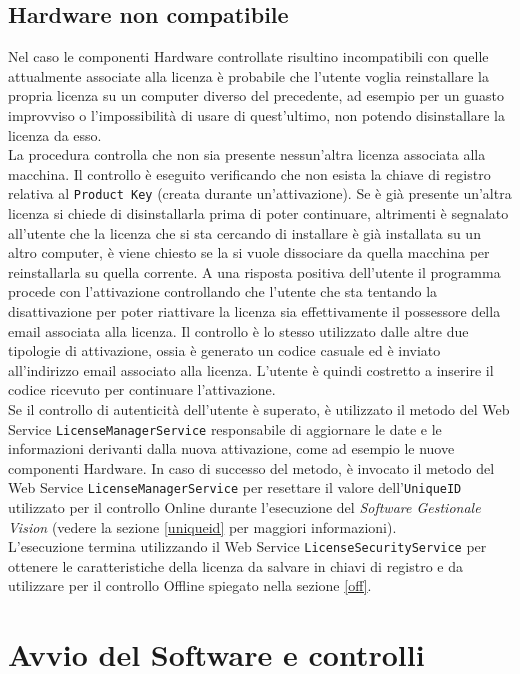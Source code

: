 \subsection{Hardware non compatibile}
\label{hnc}
Nel caso le componenti Hardware controllate risultino incompatibili con quelle attualmente associate alla licenza è probabile che l'utente voglia reinstallare la propria licenza su un computer diverso del precedente, ad esempio per un guasto improvviso o l'impossibilità di usare di quest'ultimo, non potendo disinstallare la licenza da esso. 
\\La procedura controlla che non sia presente nessun’altra licenza associata alla macchina. Il controllo è eseguito verificando che non esista la chiave di registro relativa al \texttt{Product Key} (creata durante un'attivazione). Se è già presente un’altra licenza si chiede di disinstallarla prima di poter continuare, altrimenti è segnalato all’utente che la licenza che si sta cercando di installare è già installata su un altro computer, è viene chiesto se la si vuole dissociare da quella macchina per reinstallarla su quella corrente. A una risposta positiva dell’utente il programma procede con l’attivazione controllando che l’utente che sta tentando la disattivazione per poter riattivare la licenza sia effettivamente il possessore della email associata alla licenza. Il controllo è lo stesso utilizzato dalle altre due tipologie di attivazione, ossia è generato un codice casuale ed è inviato all'indirizzo email associato alla licenza. L'utente è quindi costretto a inserire il codice ricevuto per continuare l'attivazione.
\\
Se il controllo di autenticità dell'utente è superato, è utilizzato il metodo del Web Service \texttt{LicenseManagerService} responsabile di aggiornare le date e le informazioni derivanti dalla nuova attivazione, come ad esempio le nuove componenti Hardware. In caso di successo del metodo, è invocato il metodo del Web Service \texttt{LicenseManagerService} per resettare il valore dell’\texttt{UniqueID} utilizzato per il controllo Online durante l’esecuzione del \textit{Software Gestionale Vision} (vedere la sezione \ref{uniqueid} per maggiori informazioni).\\
L’esecuzione termina utilizzando il Web Service \texttt{LicenseSecurityService} per ottenere le caratteristiche della licenza da salvare in chiavi di registro e da utilizzare per il controllo Offline spiegato nella sezione \ref{off}. 


\section{Avvio del Software e controlli}

